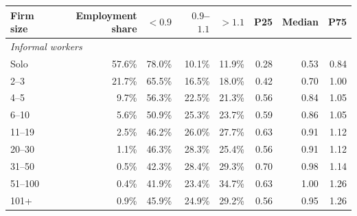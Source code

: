 \begin{tabular}{lrrrrrrr}
\toprule
    Firm size & Employment share & $<0.9$ & $0.9$--$1.1$ & $>1.1$ & P25 & Median & P75 \\
    \midrule
\multicolumn{8}{l}{\textit{Informal workers}} \\
Solo & 57.6\% & 78.0\% & 10.1\% & 11.9\% & 0.28 & 0.53 & 0.84 \\
2--3 & 21.7\% & 65.5\% & 16.5\% & 18.0\% & 0.42 & 0.70 & 1.00 \\
4--5 & 9.7\% & 56.3\% & 22.5\% & 21.3\% & 0.56 & 0.84 & 1.05 \\
6--10 & 5.6\% & 50.9\% & 25.3\% & 23.7\% & 0.59 & 0.86 & 1.05 \\
11--19 & 2.5\% & 46.2\% & 26.0\% & 27.7\% & 0.63 & 0.91 & 1.12 \\
20--30 & 1.1\% & 46.3\% & 28.3\% & 25.4\% & 0.56 & 0.91 & 1.12 \\
31--50 & 0.5\% & 42.3\% & 28.4\% & 29.3\% & 0.70 & 0.98 & 1.14 \\
51--100 & 0.4\% & 41.9\% & 23.4\% & 34.7\% & 0.63 & 1.00 & 1.26 \\
101+ & 0.9\% & 45.9\% & 24.9\% & 29.2\% & 0.56 & 0.95 & 1.26\\
\bottomrule\end{tabular}
